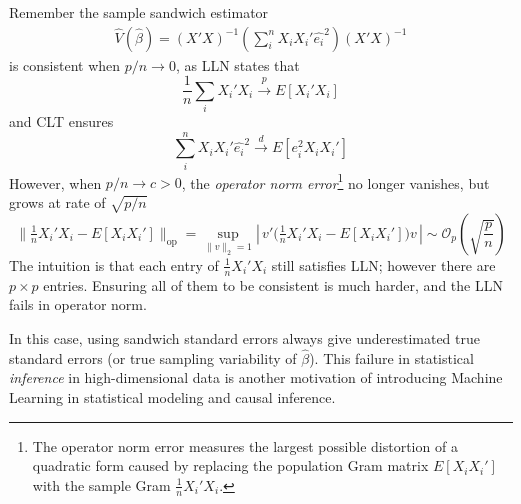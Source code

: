 \documentclass[12pt]{article}
\begin{document}
Remember the sample sandwich estimator
\begin{align*}
    \hat{V}(\hat{\beta}) = (X'X)^{-1}\left( \sum_i^{n} X_iX_i'\hat{e_i}^2 \right) (X'X)^{-1}
\end{align*}
is consistent when $p/n \rightarrow 0$, as LLN states that
$$\frac{1}{n} \sum_i X_i'X_i \xrightarrow{p}E[X_i'X_i]$$
and CLT ensures
$$
\sum_i^{n} X_iX_i'\hat{e_i}^2 \xrightarrow{d} E[e_i^2 X_i X_i']
$$
However, when $p/n \rightarrow c > 0$, the \textit{operator norm error}\footnote{The operator norm error measures the largest possible distortion of a quadratic form caused by replacing the population Gram matrix $E[X_iX_i']$ with the sample Gram $\tfrac{1}{n}X_i'X_i$.} no longer vanishes, but grows at rate of $\sqrt{p/n}$
$$
\Big\|\tfrac{1}{n}X_i'X_i - E[X_iX_i']\Big\|_{\mathrm{op}}
= \sup_{\|v\|_2=1} \left|\,v'\Big(\tfrac{1}{n}X_i'X_i - E[X_iX_i']\Big)v\,\right| \sim \mathcal{O}_p(\sqrt{\frac{p}{n}})
$$
The intuition is that each entry of $\tfrac{1}{n}X_i'X_i$ still satisfies LLN; however there are $p \times p$ entries. Ensuring all of them to be consistent is much harder, and the LLN fails in operator norm. 

In this case, using sandwich standard errors always give underestimated true standard errors (or true sampling variability of $\hat{\beta}$). This failure in statistical \textit{inference} in high-dimensional data is another motivation of introducing Machine Learning in statistical modeling and causal inference.
\end{document}
